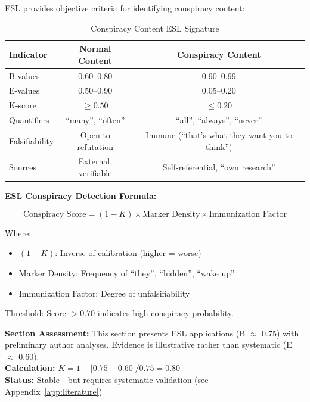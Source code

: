 \documentclass[11pt,a4paper]{article}
\begin{document}
ESL provides objective criteria for identifying conspiracy content:

\begin{table}[h]
\centering
\caption{Conspiracy Content ESL Signature}
\begin{tabular}{lcc}
\toprule
\textbf{Indicator} & \textbf{Normal Content} & \textbf{Conspiracy Content} \\
\midrule
B-values & 0.60--0.80 & 0.90--0.99 \\
E-values & 0.50--0.90 & 0.05--0.20 \\
K-score & $\geq 0.50$ & $\leq 0.20$ \\
Quantifiers & ``many'', ``often'' & ``all'', ``always'', ``never'' \\
Falsifiability & Open to refutation & Immune (``that's what they want you to think'') \\
Sources & External, verifiable & Self-referential, ``own research'' \\
\bottomrule
\end{tabular}
\end{table}

\begin{warningbox}
\textbf{ESL Conspiracy Detection Formula:}

\[
\text{Conspiracy Score} = (1 - K) \times \text{Marker Density} \times \text{Immunization Factor}
\]

Where:
\begin{itemize}
    \item $(1 - K)$: Inverse of calibration (higher = worse)
    \item Marker Density: Frequency of ``they'', ``hidden'', ``wake up''
    \item Immunization Factor: Degree of unfalsifiability
\end{itemize}

Threshold: Score $> 0.70$ indicates high conspiracy probability.
\end{warningbox}

\begin{eslbox}
\textbf{Section Assessment:} This section presents ESL applications (B $\approx$ 0.75) with preliminary author analyses. Evidence is illustrative rather than systematic (E $\approx$ 0.60). \\[0.3em]
\textbf{Calculation:} $K = 1 - |0.75 - 0.60| / 0.75 = 0.80$ \\
\textbf{Status:} \textcolor{green!60!black}{Stable}---but requires systematic validation (see Appendix~\ref{app:literature})
\end{eslbox}
\end{document}

